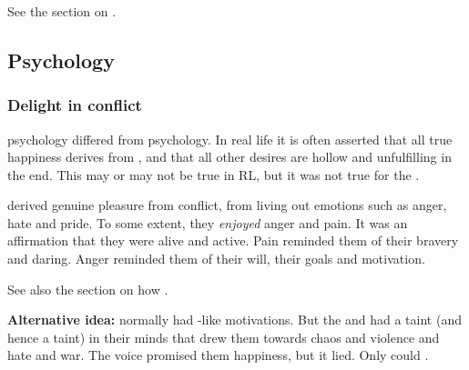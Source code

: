 \subsubsection{\Noggyaleth}
See the section on . 









\subsection{Psychology}





\subsubsection{Delight in conflict}
\Resphan psychology differed from \human psychology.
In real life it is often asserted that all true happiness derives from , and that all other desires are hollow and unfulfilling in the end.
This may or may not be true in RL, but it was not true for the \resphain.

\Resphain derived genuine pleasure from conflict, from living out  emotions such as anger, hate and pride.
To some extent, they \emph{enjoyed} anger and pain.
It was an affirmation that they were alive and active.
Pain reminded them of their bravery and daring.
Anger reminded them of their will, their goals and motivation.

See also the section on how .

\textbf{Alternative idea:} 
\Resphain normally had \human-like motivations.
But the \satharioth and \ketherain had a \draconian taint (and hence a \xs taint) in their minds that drew them towards chaos and violence and hate and war. 
The voice promised them happiness, but it lied.
Only \dragons could . 






